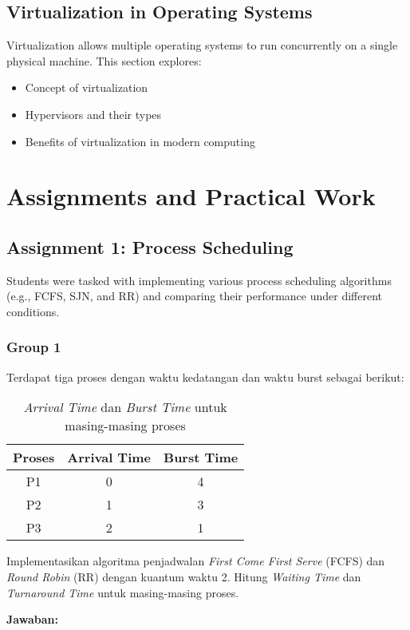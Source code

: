 \documentclass[12pt]{article}
\begin{document}
\subsection{Virtualization in Operating Systems}
Virtualization allows multiple operating systems to run concurrently on a single physical machine. This section explores:
\begin{itemize}
    \item Concept of virtualization
    \item Hypervisors and their types
    \item Benefits of virtualization in modern computing
\end{itemize}

\section{Assignments and Practical Work}
\subsection{Assignment 1: Process Scheduling}
Students were tasked with implementing various process scheduling algorithms (e.g., FCFS, SJN, and RR) and comparing their performance under different conditions.
\subsubsection{Group 1}
Terdapat tiga proses dengan waktu kedatangan dan waktu burst sebagai berikut:

\begin{table}[h!]
\centering
\begin{tabular}{|c|c|c|}
\hline
\textbf{Proses} & \textbf{Arrival Time} & \textbf{Burst Time} \\ \hline
P1 & 0 & 4 \\ \hline
P2 & 1 & 3 \\ \hline
P3 & 2 & 1 \\ \hline
\end{tabular}
\caption {\textit{Arrival Time} dan \textit{Burst Time }untuk masing-masing proses}
\end{table}

Implementasikan algoritma penjadwalan \textit{First Come First Serve} (FCFS) dan \textit {Round Robin} (RR) dengan kuantum waktu 2. Hitung \textit{Waiting Time} dan \textit{Turnaround Time} untuk masing-masing proses. 
\vspace{0.2cm}

\textbf{Jawaban: }
\end{document}
